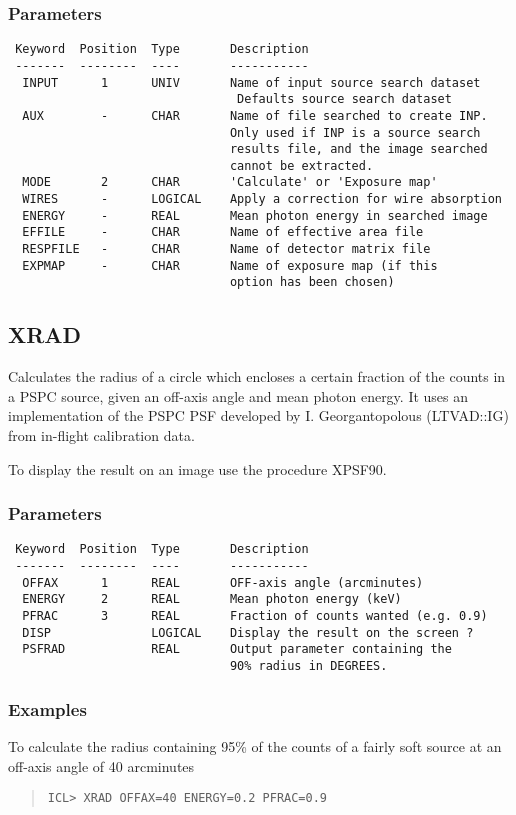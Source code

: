 \documentclass{book}
\renewcommand{\_}{{\tt\char'137}}     %
\begin{document}
\subsubsection{Parameters}
\begin{verbatim}
 Keyword  Position  Type       Description
 -------  --------  ----       -----------
  INPUT      1      UNIV       Name of input source search dataset
                                Defaults source search dataset
  AUX        -      CHAR       Name of file searched to create INP.
                               Only used if INP is a source search
                               results file, and the image searched
                               cannot be extracted.
  MODE       2      CHAR       'Calculate' or 'Exposure map'
  WIRES      -      LOGICAL    Apply a correction for wire absorption
  ENERGY     -      REAL       Mean photon energy in searched image
  EFFILE     -      CHAR       Name of effective area file
  RESPFILE   -      CHAR       Name of detector matrix file
  EXPMAP     -      CHAR       Name of exposure map (if this
                               option has been chosen)

\end{verbatim}\subsection{XRAD}
Calculates the radius of a circle which encloses a certain fraction
of the counts in a PSPC source, given an off-axis angle and mean
photon energy. It uses an implementation of the PSPC PSF developed
by I. Georgantopolous (LTVAD::IG) from in-flight calibration data.

To display the result on an image use the procedure XPSF90.

\subsubsection{Parameters}
\begin{verbatim}
 Keyword  Position  Type       Description
 -------  --------  ----       -----------
  OFFAX      1      REAL       OFF-axis angle (arcminutes)
  ENERGY     2      REAL       Mean photon energy (keV)
  PFRAC      3      REAL       Fraction of counts wanted (e.g. 0.9)
  DISP              LOGICAL    Display the result on the screen ?
  PSFRAD            REAL       Output parameter containing the
                               90% radius in DEGREES.
\end{verbatim}\subsubsection{Examples}
To calculate the radius containing 95\% of the counts of a fairly soft
source at an off-axis angle of 40 arcminutes
\begin{quote}\begin{verbatim}
ICL> XRAD OFFAX=40 ENERGY=0.2 PFRAC=0.9
\end{verbatim}\end{quote}
\end{document}
